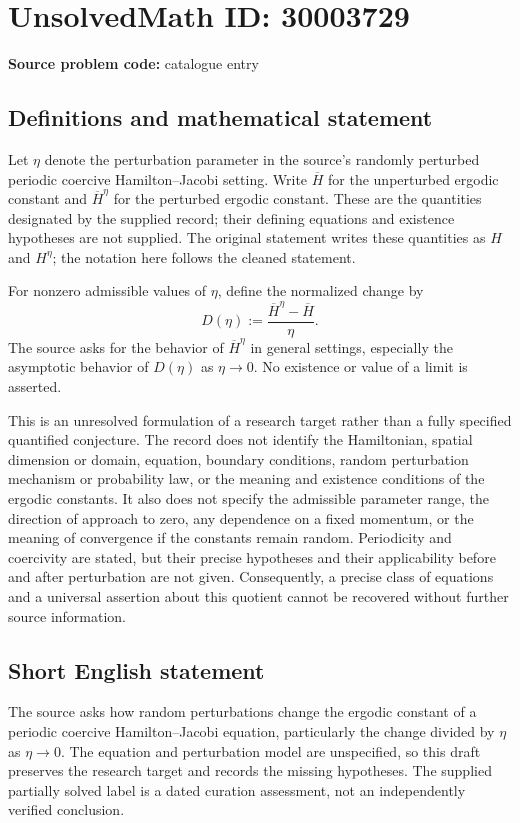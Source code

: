 \documentclass[11pt]{article}
\begin{document}
\section*{UnsolvedMath ID: 30003729}
\textbf{Source problem code:} catalogue entry
\subsection{Definitions and mathematical statement}
Let \(\eta\) denote the perturbation parameter in the source's randomly perturbed periodic coercive Hamilton--Jacobi setting. Write \(\overline H\) for the unperturbed ergodic constant and \(\overline H^\eta\) for the perturbed ergodic constant. These are the quantities designated by the supplied record; their defining equations and existence hypotheses are not supplied. The original statement writes these quantities as \(H\) and \(H^\eta\); the notation here follows the cleaned statement.

For nonzero admissible values of \(\eta\), define the normalized change by
\[
D(\eta):=\frac{\overline H^\eta-\overline H}{\eta}.
\]
The source asks for the behavior of \(\overline H^\eta\) in general settings, especially the asymptotic behavior of \(D(\eta)\) as \(\eta\to0\). No existence or value of a limit is asserted.

This is an unresolved formulation of a research target rather than a fully specified quantified conjecture. The record does not identify the Hamiltonian, spatial dimension or domain, equation, boundary conditions, random perturbation mechanism or probability law, or the meaning and existence conditions of the ergodic constants. It also does not specify the admissible parameter range, the direction of approach to zero, any dependence on a fixed momentum, or the meaning of convergence if the constants remain random. Periodicity and coercivity are stated, but their precise hypotheses and their applicability before and after perturbation are not given. Consequently, a precise class of equations and a universal assertion about this quotient cannot be recovered without further source information.
\subsection{Short English statement}
The source asks how random perturbations change the ergodic constant of a periodic coercive Hamilton--Jacobi equation, particularly the change divided by \(\eta\) as \(\eta\to0\). The equation and perturbation model are unspecified, so this draft preserves the research target and records the missing hypotheses. The supplied partially solved label is a dated curation assessment, not an independently verified conclusion.
\end{document}
